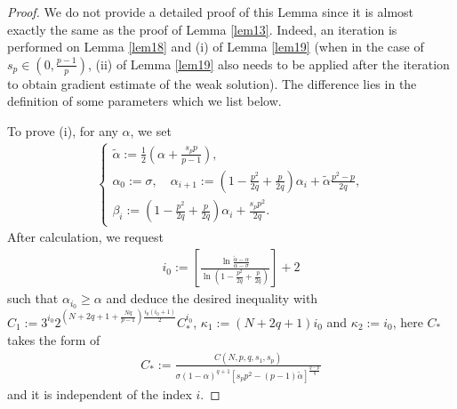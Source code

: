 \documentclass[reqno,10pt]{amsart}
\numberwithin{equation}{section}
\begin{document}
\begin{proof}
	We do not provide a detailed proof of this Lemma since it is almost exactly the same as the proof of Lemma \ref{lem13}. Indeed, an iteration is performed on Lemma \ref{lem18} and (i) of Lemma \ref{lem19} (when in the case of $s_p\in\left( 0,\frac{p-1}{p}\right)$, (ii) of Lemma \ref{lem19} also needs to be applied after the iteration to obtain gradient estimate of the weak solution). The difference lies in the definition of some parameters which we list below.
	
	To prove (i), for any $\alpha$, we set
	\begin{align*}
		\begin{cases}
			\tilde{\alpha}:=\frac{1}{2}\left(\alpha+\frac{s_pp}{p-1}\right),\\
			\alpha_0:=\sigma,\quad\alpha_{i+1}:=\left( 1-\frac{p^2}{2q}+\frac{p}{2q}\right)\alpha_i+\tilde{\alpha}\frac{p^2-p}{2q},\\
			\beta_i:=\left( 1-\frac{p^2}{2q}+\frac{p}{2q}\right)\alpha_i+\frac{s_pp^2}{2q}.
		\end{cases}
	\end{align*}
	After calculation, we request
	\begin{align*}
		i_0:=\left[\frac{\ln\frac{\tilde{\alpha}-\alpha}{\alpha-\sigma}}{\ln\left( 1-\frac{p^2}{2q}+\frac{p}{2q}\right) }\right]+2 
	\end{align*}
	such that $\alpha_{i_0}\ge\alpha$ and deduce the desired inequality with $C_1:=3^{i_0}2^{\left(N+2q+1+\frac{Nq}{p-1}\right)\frac{i_0(i_0+1)}{2} }C^{i_0}_*$, $\kappa_1:=(N+2q+1)i_0$ and $\kappa_2:=i_0$, here $C_*$ takes the form of
	\begin{align*}
		C_*:=\frac{C(N,p,q,s_1,s_p)}{\sigma(1-\alpha)^{q+1}\left[s_pp^2-(p-1)\tilde{\alpha}\right]^{\frac{q-p}{q}}}
	\end{align*}
	and it is independent of the index $i$.
	

\end{proof}
\end{document}
